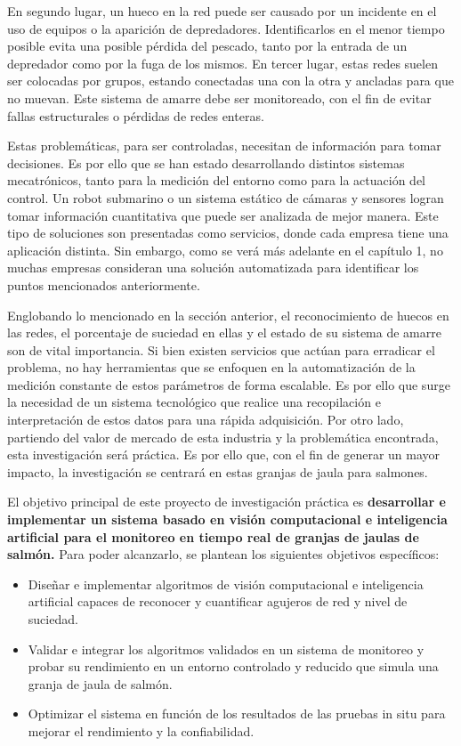 En segundo lugar, un hueco en la red puede ser causado por un incidente en el uso de equipos o la aparición de depredadores. Identificarlos en el menor tiempo posible evita una posible pérdida del pescado, tanto por la entrada de un depredador como por la fuga de los mismos. En tercer lugar, estas redes suelen ser colocadas por grupos, estando conectadas una con la otra y ancladas para que no muevan. Este sistema de amarre debe ser monitoreado, con el fin de evitar fallas estructurales o pérdidas de redes enteras. 

Estas problemáticas, para ser controladas, necesitan de información para tomar decisiones. Es por ello que se han estado desarrollando distintos sistemas mecatrónicos, tanto para la medición del entorno como para la actuación del control. Un robot submarino o un sistema estático de cámaras y sensores logran tomar información cuantitativa que puede ser analizada de mejor manera. Este tipo de soluciones son presentadas como servicios, donde cada empresa tiene una aplicación distinta. Sin embargo, como se verá más adelante en el capítulo 1, no muchas empresas consideran una solución automatizada para identificar los puntos mencionados anteriormente. 


Englobando lo mencionado en la sección anterior, el reconocimiento de huecos en las redes, el porcentaje de suciedad en ellas y el estado de su sistema de amarre son de vital importancia. Si bien existen servicios que actúan para erradicar el problema, no hay herramientas que se enfoquen en la automatización de la medición constante de estos parámetros de forma escalable. Es por ello que surge la necesidad de un sistema tecnológico que realice una recopilación e interpretación de estos datos para una rápida adquisición. Por otro lado, partiendo del valor de mercado de esta industria y la problemática encontrada, esta investigación será práctica. Es por ello que, con el fin de generar un mayor impacto, la investigación se centrará en estas granjas de jaula para salmones.  


El objetivo principal de este proyecto de investigación práctica es \textbf{desarrollar e implementar un sistema basado en visión computacional e inteligencia artificial para el monitoreo en tiempo real de granjas de jaulas de salmón.} Para poder alcanzarlo, se plantean los siguientes objetivos específicos:

\begin{itemize}
    \item Diseñar e implementar algoritmos de visión computacional e inteligencia artificial capaces de reconocer y cuantificar agujeros de red y nivel de suciedad.
    \item Validar e integrar los algoritmos validados en un sistema de monitoreo y probar su rendimiento en un entorno controlado y reducido que simula una granja de jaula de salmón.
    \item Optimizar el sistema en función de los resultados de las pruebas in situ para mejorar el rendimiento y la confiabilidad.
\end{itemize}

